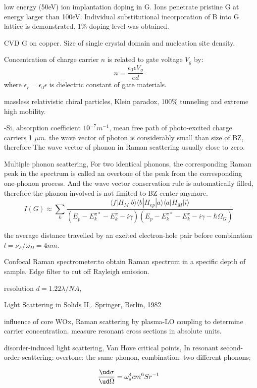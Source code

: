 low energy (50eV) ion implantation doping in G. Ions penetrate pristine G at energy larger than 100eV. Individual substitutional incorporation of B into G lattice is demonstrated. 1\% doping level was obtained. \cite{Bangert2013}


CVD G on copper. Size of single crystal domain and nucleation site density.\cite{Wu2013b}

Concentration of charge carrier $n$ is related to gate voltage $V_g$ by:
\[
n = \frac{\epsilon_0 \epsilon V_g}{ed}
\]
where $\epsilon_r = \epsilon_0 \epsilon$ is dielectric constant of gate materials.

massless relativistic chiral particles, Klein paradox, 100\% tunneling and extreme high mobility.

-Si,  absorption coefficient $10^{-7}m^{-1}$, mean free path of photo-excited charge carriers 1 $\mu m$. the wave vector of photon is considerably small than size of BZ, therefore The wave vector of phonon in Raman scattering usually close to zero.

Multiple phonon scattering, For two identical phonons, the corresponding Raman peak in the spectrum is called an overtone of the peak from the corresponding one-phonon process. And the wave vector conservation rule is automatically filled, therefore the phonon involved is not limited to BZ center anymore.
\[
I(G) \approx \sum_k \frac{\langle f|H_M|b\rangle \langle b|H_{ep}|a\rangle \langle a|H_M|i\rangle}{(E_p - E_k^{\pi *}- E_k^{\pi}-i\gamma)(E_p - E_k^{\pi *}- E_k^{\pi}-i\gamma- \hbar\Omega_{G})}
\]

the average distance travelled by an excited electron-hole pair before combination $l=\nu_F/\omega_D=4nm$.

Confocal Raman spectrometer:to obtain Raman spectrum in a specific depth of sample. Edge filter to cut off Rayleigh emission.

resolution $d= 1.22 \lambda/NA$,

Light Scattering in Solids II,. Springer, Berlin, 1982

influence of core WOx, Raman scattering by plasma-LO coupling to determine carrier concentration. measure resonant cross sections in absolute units.

disorder-induced light scattering, Van Hove critical points,
In resonant second-order scattering:
overtone: the same phonon,
combination: two different phonons;

\[
\frac{\ud\sigma}{\ud\Omega}= \omega_s^4 cm^6 Sr^{-1}
\]

